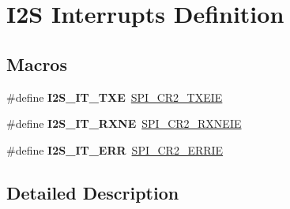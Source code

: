 \hypertarget{group___i2_s___interrupts___definition}{}\section{I2S Interrupts Definition}
\label{group___i2_s___interrupts___definition}
\subsection*{Macros}
\begin{DoxyCompactItemize}
\item 
\#define {\bfseries I2\+S\+\_\+\+I\+T\+\_\+\+T\+XE}~\hyperlink{group___peripheral___registers___bits___definition_ga23f683a1252ccaf625cae1a978989b2c}{S\+P\+I\+\_\+\+C\+R2\+\_\+\+T\+X\+E\+IE}\hypertarget{group___i2_s___interrupts___definition_ga84eabe0973f1fdceecbe9ff650a2bee4}{}\label{group___i2_s___interrupts___definition_ga84eabe0973f1fdceecbe9ff650a2bee4}

\item 
\#define {\bfseries I2\+S\+\_\+\+I\+T\+\_\+\+R\+X\+NE}~\hyperlink{group___peripheral___registers___bits___definition_gaa7d4c37fbbcced7f2a0421e6ffd103ea}{S\+P\+I\+\_\+\+C\+R2\+\_\+\+R\+X\+N\+E\+IE}\hypertarget{group___i2_s___interrupts___definition_ga09b5f25a752905586daa4cb170043f71}{}\label{group___i2_s___interrupts___definition_ga09b5f25a752905586daa4cb170043f71}

\item 
\#define {\bfseries I2\+S\+\_\+\+I\+T\+\_\+\+E\+RR}~\hyperlink{group___peripheral___registers___bits___definition_gaf18705567de7ab52a62e5ef3ba27418b}{S\+P\+I\+\_\+\+C\+R2\+\_\+\+E\+R\+R\+IE}\hypertarget{group___i2_s___interrupts___definition_ga7dc89e4d9188a5b7122f9f6948c28a00}{}\label{group___i2_s___interrupts___definition_ga7dc89e4d9188a5b7122f9f6948c28a00}

\end{DoxyCompactItemize}


\subsection{Detailed Description}
